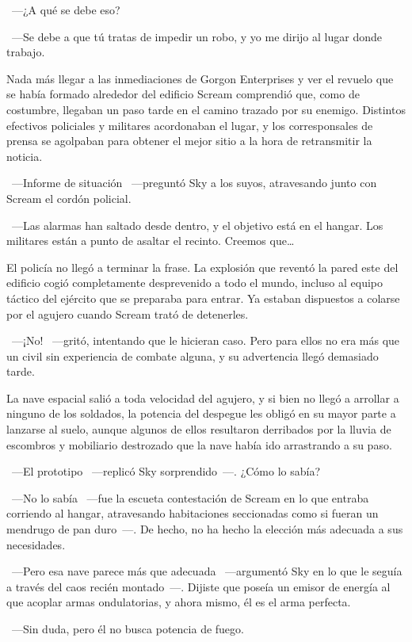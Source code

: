 ~---¿A qué se debe eso?

~---Se debe a que tú tratas de impedir un robo, y yo me dirijo al lugar donde trabajo.

\bigskip\noindent
Nada más llegar a las inmediaciones de Gorgon Enterprises y ver el revuelo que se había formado alrededor del edificio Scream comprendió que, como de costumbre, llegaban un paso tarde en el camino trazado por su enemigo. Distintos efectivos policiales y militares acordonaban el lugar, y los corresponsales de prensa se agolpaban para obtener el mejor sitio a la hora de retransmitir la noticia.

~---Informe de situación ~---preguntó Sky a los suyos, atravesando junto con Scream el cordón policial.

~---Las alarmas han saltado desde dentro, y el objetivo está en el hangar. Los militares están a punto de asaltar el recinto. Creemos que\dots

El policía no llegó a terminar la frase. La explosión que reventó la pared este del edificio cogió completamente desprevenido a todo el mundo, incluso al equipo táctico del ejército que se preparaba para entrar. Ya estaban dispuestos a colarse por el agujero cuando Scream trató de detenerles.

~---¡No! ~---gritó, intentando que le hicieran caso. Pero para ellos no era más que un civil sin experiencia de combate alguna, y su advertencia llegó demasiado tarde.

La nave espacial salió a toda velocidad del agujero, y si bien no llegó a arrollar a ninguno de los soldados, la potencia del despegue les obligó en su mayor parte a lanzarse al suelo, aunque algunos de ellos resultaron derribados por la lluvia de escombros y mobiliario destrozado que la nave había ido arrastrando a su paso.

~---El prototipo ~---replicó Sky sorprendido~---. ¿Cómo lo sabía?

~---No lo sabía ~---fue la escueta contestación de Scream en lo que entraba corriendo al hangar, atravesando habitaciones seccionadas como si fueran un mendrugo de pan duro~---. De hecho, no ha hecho la elección más adecuada a sus necesidades.

~---Pero esa nave parece más que adecuada ~---argumentó Sky en lo que le seguía a través del caos recién montado~---. Dijiste que poseía un emisor de energía al que acoplar armas ondulatorias, y ahora mismo, él es el arma perfecta.

~---Sin duda, pero él no busca potencia de fuego.

